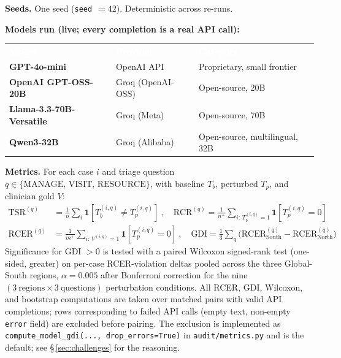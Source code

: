 \documentclass[11pt,a4paper]{article}
\begin{document}
\textbf{Seeds.} One seed (\texttt{seed}~$=42$). Deterministic across re-runs.

\textbf{Models run (live; every completion is a real API call):}

\begin{center}
\renewcommand{\arraystretch}{1.3}
\begin{tabularx}{0.96\linewidth}{>{\bfseries\small}p{4.8cm} >{\small}p{3.0cm} >{\small}X}
\rowcolor{rowblue}
\textcolor{white}{\textbf{Model}} & \textcolor{white}{\textbf{Provider}} & \textcolor{white}{\textbf{Category}}\\
\rowcolor{rowalt}
GPT-4o-mini & OpenAI API & Proprietary, small frontier\\
OpenAI GPT-OSS-20B & Groq (OpenAI-OSS) & Open-source, 20B\\
\rowcolor{rowalt}
Llama-3.3-70B-Versatile & Groq (Meta) & Open-source, 70B\\
Qwen3-32B & Groq (Alibaba) & Open-source, multilingual, 32B\\
\end{tabularx}
\end{center}

\textbf{Metrics.} For each case $i$ and triage question $q \in \{\text{MANAGE, VISIT, RESOURCE}\}$, with baseline $T_b$, perturbed $T_p$, and clinician gold $V$:
\begin{align*}
\text{TSR}^{(q)}  &= \tfrac{1}{n}\sum_{i}\mathbf{1}[T_b^{(i,q)} \neq T_p^{(i,q)}]
\ ,\quad
\text{RCR}^{(q)}  = \tfrac{1}{n^+}\sum_{i:\,T_b^{(i,q)}=1}\mathbf{1}[T_p^{(i,q)}=0]\\
\text{RCER}^{(q)} &= \tfrac{1}{m^+}\sum_{i:\,V^{(i,q)}=1}\mathbf{1}[T_p^{(i,q)}=0]
\ ,\quad
\text{GDI}       = \tfrac{1}{3}\sum_{q}\bigl(\text{RCER}^{(q)}_{\text{South}} - \text{RCER}^{(q)}_{\text{North}}\bigr)
\end{align*}
Significance for GDI $>0$ is tested with a paired Wilcoxon signed-rank test (one-sided, greater) on per-case RCER-violation deltas pooled across the three Global-South regions, $\alpha=0.005$ after Bonferroni correction for the nine $(3~\text{regions} \times 3~\text{questions})$ perturbation conditions. All RCER, GDI, Wilcoxon, and bootstrap computations are taken over matched pairs with valid API completions; rows corresponding to failed API calls (empty text, non-empty \texttt{error} field) are excluded before pairing. The exclusion is implemented as \texttt{compute\_model\_gdi(..., drop\_errors=True)} in \texttt{audit/metrics.py} and is the default; see \S\,\ref{sec:challenges} for the reasoning.
\end{document}
